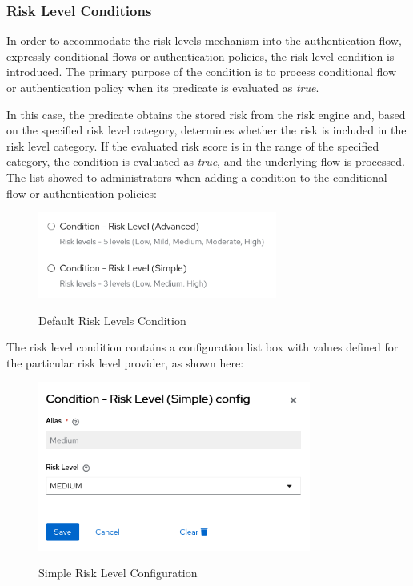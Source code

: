 \subsubsection{Risk Level Conditions}
In order to accommodate the risk levels mechanism into the authentication flow, expressly conditional flows or authentication policies, the risk level condition is introduced.
The primary purpose of the condition is to process conditional flow or authentication policy when its predicate is evaluated as \textit{true}.

In this case, the predicate obtains the stored risk from the risk engine and, based on the specified risk level category, determines whether the risk is included in the risk level category.
If the evaluated risk score is in the range of the specified category, the condition is evaluated as \textit{true}, and the underlying flow is processed.
\newline
\newline
The list showed to administrators when adding a condition to the conditional flow or authentication policies:

\begin{figure}[htbp]
  \centering
  \includegraphics[width=0.7\textwidth]{img/sections/5-design/risk-level-condition-list.png}
  \label{fig:risk-levels-condition}
  \caption{Default Risk Levels Condition}
\end{figure}

The risk level condition contains a configuration list box with values defined for the particular risk level provider, as shown here:

\begin{figure}[htbp]
  \centering
  \includegraphics[width=0.8\textwidth]{img/sections/5-design/risk-level-simple-config.png}
  \label{fig:risk-levels-simple-config}
  \caption{Simple Risk Level Configuration}
\end{figure}

